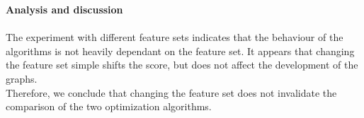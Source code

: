 \textbf{Analysis and discussion}\\
\\
The experiment with different feature sets indicates that the behaviour of the algorithms
is not heavily dependant on the feature set.
It appears that changing the feature set simple shifts the score, but does not affect the development of the graphs.\\
Therefore, we conclude that changing the feature set does not invalidate
the comparison of the two optimization algorithms.

